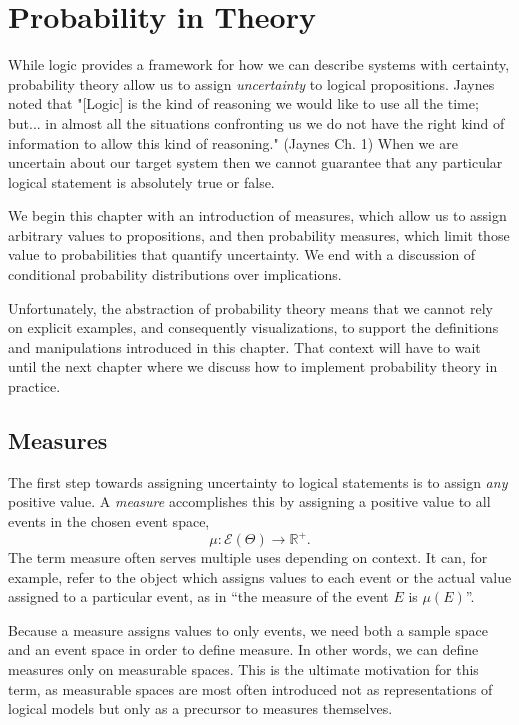 \chapter{Probability in Theory}

While logic provides a framework for how we can describe systems 
with certainty, probability theory allow us to assign \emph{uncertainty} 
to logical propositions. Jaynes noted that "[Logic] is the kind of
reasoning we would like to use all the time; but... in almost all 
the situations confronting us we do not have the right kind of 
information to allow this kind of reasoning." (Jaynes Ch. 1) 
When we are uncertain about our target system then we cannot
guarantee that any particular logical statement is absolutely
true or false. 

We begin this chapter with an introduction of measures, which allow us
to assign arbitrary values to propositions, and then probability measures, 
which limit those value to probabilities that quantify uncertainty. 
We end with a discussion of conditional probability distributions 
over implications.

Unfortunately, the abstraction of probability theory means that we 
cannot rely on explicit examples, and consequently visualizations, 
to support the definitions and manipulations introduced in this chapter.  
That context will have to wait until the next chapter where we discuss 
how to implement probability theory in practice.

\section{Measures}

The first step towards assigning uncertainty to logical statements is to
assign \emph{any} positive value.  A \emph{measure} accomplishes this
by assigning a positive value to all events in the chosen event space,
%
\begin{equation*}
\mu : \mathcal{E} \! \left( \Theta \right) \rightarrow \mathbb{R}^{+}.
\end{equation*}
%
The term measure often serves multiple uses depending on context.
It can, for example, refer to the object which assigns values to each
event or the actual value assigned to a particular event, as in ``the 
measure of the event $E$ is $\mu \! \left( E \right)$''.

Because a measure assigns values to only events, we need both a
sample space and an event space in order to define measure.  In
other words, we can define measures only on measurable spaces.  
This is the ultimate motivation for this term, as measurable spaces 
are most often introduced not as representations of logical models
but only as a precursor to measures themselves.

